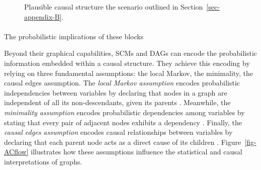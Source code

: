 \documentclass[
  authoryear,
  review,
  1p]{elsarticle}
\makeatletter
\let\oldparagraph\paragraph
\renewcommand{\paragraph}{
    \@ifstar
      \xxxParagraphStar
      \xxxParagraphNoStar
  }
\newcommand{\xxxParagraphStar}[1]{\oldparagraph*{#1}\mbox{}}
\newcommand{\xxxParagraphNoStar}[1]{\oldparagraph{#1}\mbox{}}
\makeatother
\begin{document}
\begin{figure}

\begin{minipage}{0.50\linewidth}

\centering{

\[
\begin{aligned}
  X & := f_{X}(e_{X}) \\
  T & := f_{T}(X,e_{T}) \\
  Y & := f_{Y}(T,X,e_{Y}) \\
  e_{T} & \:\bot\:e_{X} \\
  e_{T} & \:\bot\:e_{Y} \\
  e_{X} & \:\bot\:e_{Y}
\end{aligned}
\]

}


\end{minipage}%
%
\begin{minipage}{0.50\linewidth}



\end{minipage}%

\caption{\label{fig-example1}Plausible causal structure the scenario
outlined in Section~\ref{sec-appendix-B}.}

\end{figure}%

\paragraph{The probabilistic implications of these
blocks}\label{sec-appendix-B22}

Beyond their graphical capabilities, SCMs and DAGs can encode the
probabilistic information embedded within a causal structure. They
achieve this encoding by relying on three fundamental assumptions: the
local Markov, the minimality, the causal edges assumption. The
\emph{local Markov assumption} encodes probabilistic independencies
between variables by declaring that nodes in a graph are independent of
all its non-descendants, given its parents \citep[pp.~20]{Neal_2020}.
Meanwhile, the \emph{minimality assumption} encodes probabilistic
dependencies among variables by stating that every pair of adjacent
nodes exhibits a dependency \citep[pp.~21]{Neal_2020}. Finally, the
\emph{causal edges assumption} encodes causal relationships between
variables by declaring that each parent node acts as a direct cause of
its children \citep[pp.~22]{Neal_2020}. Figure~\ref{fig-ACflow}
illustrates how these assumptions influence the statistical and causal
interpretations of graphs.
\end{document}

